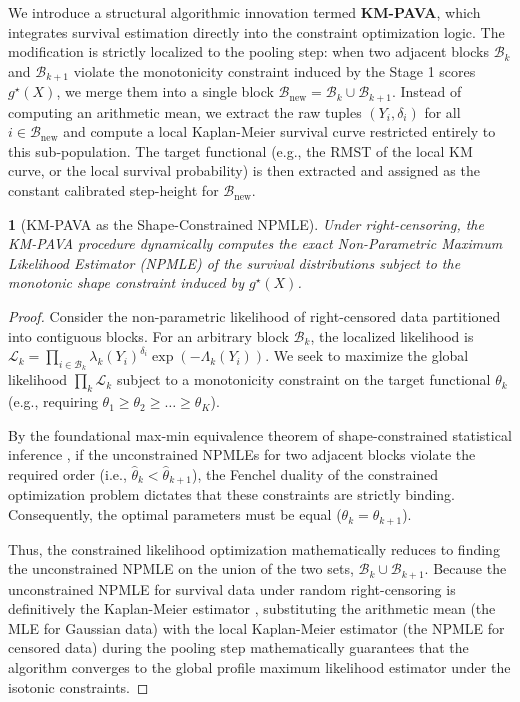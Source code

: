 \documentclass[11pt]{article}
\theoremstyle{plain}
\theoremstyle{plain}
\theoremstyle{plain}
\theoremstyle{plain}
\newtheorem{theorem}{\protect\theoremname}
\theoremstyle{plain}
\theoremstyle{plain}
\theoremstyle{plain}
\providecommand{\theoremname}{Theorem}
\begin{document}
{We introduce a structural algorithmic innovation termed \textbf{KM-PAVA}, which integrates survival estimation directly into the constraint optimization logic. The modification is strictly localized to the pooling step: when two adjacent blocks $\mathcal{B}_k$ and $\mathcal{B}_{k+1}$ violate the monotonicity constraint induced by the Stage 1 scores $g^\star(X)$, we merge them into a single block $\mathcal{B}_{\text{new}} = \mathcal{B}_k \cup \mathcal{B}_{k+1}$. Instead of computing an arithmetic mean, we extract the raw tuples $(Y_i, \delta_i)$ for all $i \in \mathcal{B}_{\text{new}}$ and compute a local Kaplan-Meier survival curve restricted entirely to this sub-population. The target functional (e.g., the RMST of the local KM curve, or the local survival probability) is then extracted and assigned as the constant calibrated step-height for $\mathcal{B}_{\text{new}}$.

\begin{theorem}[KM-PAVA as the Shape-Constrained NPMLE]
\label{thm:km_pava}
Under right-censoring, the KM-PAVA procedure dynamically computes the exact Non-Parametric Maximum Likelihood Estimator (NPMLE) of the survival distributions subject to the monotonic shape constraint induced by $g^\star(X)$.
\end{theorem}

\begin{proof}
Consider the non-parametric likelihood of right-censored data partitioned into contiguous blocks. For an arbitrary block $\mathcal{B}_k$, the localized likelihood is $\mathcal{L}_k = \prod_{i \in \mathcal{B}_k} \lambda_k(Y_i)^{\delta_i} \exp(-\Lambda_k(Y_i))$. We seek to maximize the global likelihood $\prod_k \mathcal{L}_k$ subject to a monotonicity constraint on the target functional $\theta_k$ (e.g., requiring $\theta_1 \ge \theta_2 \ge \dots \ge \theta_K$). 

By the foundational max-min equivalence theorem of shape-constrained statistical inference \citep{barlow1972statistical}, if the unconstrained NPMLEs for two adjacent blocks violate the required order (i.e., $\hat{\theta}_k < \hat{\theta}_{k+1}$), the Fenchel duality of the constrained optimization problem dictates that these constraints are strictly binding. Consequently, the optimal parameters must be equal ($\theta_k = \theta_{k+1}$). 

Thus, the constrained likelihood optimization mathematically reduces to finding the unconstrained NPMLE on the union of the two sets, $\mathcal{B}_k \cup \mathcal{B}_{k+1}$. Because the unconstrained NPMLE for survival data under random right-censoring is definitively the Kaplan-Meier estimator \citep{kaplan1958nonparametric}, substituting the arithmetic mean (the MLE for Gaussian data) with the local Kaplan-Meier estimator (the NPMLE for censored data) during the pooling step mathematically guarantees that the algorithm converges to the global profile maximum likelihood estimator under the isotonic constraints.
\end{proof}


}
\end{document}
